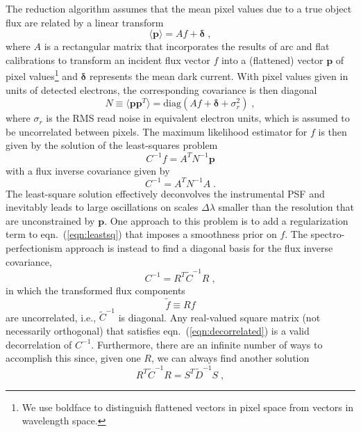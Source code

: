 \documentclass[12pt]{article}
\providecommand{\eqn}[1]{eqn.~(\ref{eqn:#1})}
\providecommand{\vecsymbol}[1]{\ensuremath{\boldsymbol{#1}}}
\providecommand{\pv}{\vecsymbol{p}}
\providecommand{\deltav}{\vecsymbol{\delta}}
\begin{document}
The reduction algorithm assumes that the mean pixel values due to a true object flux are related by a linear transform
\begin{equation}
\langle \pv \rangle = A f + \deltav \; ,
\end{equation}
where $A$ is a rectangular matrix that incorporates the results of arc and flat calibrations to transform an incident flux vector $f$ into a (flattened) vector $\pv$ of pixel values\footnote{We use boldface to distinguish flattened vectors in pixel space from vectors in wavelength space.} and $\deltav$ represents the mean dark current. With pixel values given in units of detected electrons, the corresponding covariance is then diagonal
\begin{equation}
N \equiv \langle\pv \pv^T\rangle = \text{diag}\left( A f + \deltav + \sigma^2_{r} \right) \; ,
\end{equation}
where $\sigma_r$ is the RMS read noise in equivalent electron units, which is assumed to be uncorrelated between pixels. The maximum likelihood estimator for $f$ is then given by the solution of the least-squares problem
\begin{equation}
C^{-1} f = A^T N^{-1} \pv
\label{eqn:leastsq}
\end{equation}
with a flux inverse covariance given by
\begin{equation}
C^{-1} = A^T N^{-1} A \; .
\end{equation}
The least-square solution effectively deconvolves the instrumental PSF and inevitably leads to large oscillations on scales $\Delta\lambda$ smaller than the resolution that are unconstrained by $\pv$. One approach to this problem is to add a regularization term to \eqn{leastsq} that imposes a smoothness prior on $f$.  The spectro-perfectionism approach is instead to find a diagonal basis for the flux inverse covariance,
\begin{equation}
C^{-1} = R^T \tilde{C}^{-1} R \; ,
\label{eqn:decorrelated}
\end{equation}
in which the transformed flux components
\begin{equation}
\tilde{f} \equiv R f
\end{equation}
are uncorrelated, i.e., $\tilde{C}^{-1}$ is diagonal. Any real-valued square matrix (not necessarily orthogonal) that satisfies \eqn{decorrelated} is a valid decorrelation of $C^{-1}$. Furthermore, there are an infinite number of ways to accomplish this since, given one $R$, we can always find another solution
\begin{equation}
R^T \tilde{C}^{-1} R = S^T \tilde{D}^{-1} S \; ,
\end{equation}
\end{document}
